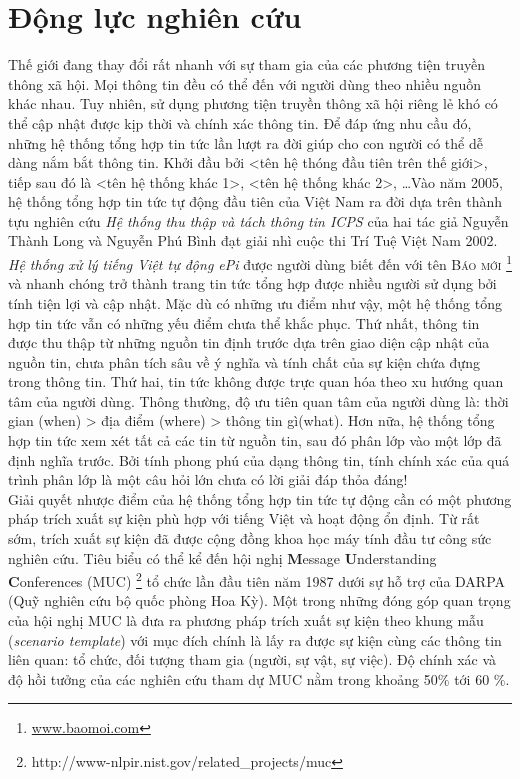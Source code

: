 \section{Động lực nghiên cứu}
\label{motivation}
\noindent \noindent Thế giới đang thay đổi rất nhanh  với sự tham gia của các phương tiện truyền thông xã hội. Mọi thông tin đều có thể đến với người dùng theo nhiều nguồn khác nhau. Tuy nhiên, sử dụng phương tiện truyền thông xã hội riêng lẻ khó có thể cập nhật được kịp thời và chính xác thông tin. Để đáp ứng nhu cầu đó, những hệ thống tổng hợp tin tức lần lượt ra đời giúp cho con người có thể dễ dàng nắm bắt thông tin. Khởi đầu bởi <tên hệ thóng đầu tiên trên thế giới>, tiếp sau đó là  <tên hệ thống khác 1>, <tên hệ thống khác 2>, \ldots Vào năm 2005, hệ thống tổng hợp tin tức tự động đầu tiên của Việt Nam ra đời dựa trên thành tựu nghiên cứu \emph{Hệ thống thu thập và tách thông tin ICPS} của hai tác giả Nguyễn Thành Long và Nguyễn Phú Bình đạt giải nhì cuộc thi Trí Tuệ Việt Nam 2002. \emph{Hệ thống xử lý tiếng Việt tự động ePi}  được người dùng biết đến với tên \textsc{Báo mới} \footnote{\href{www.baomoi.com}{www.baomoi.com}} và nhanh chóng trở thành trang tin tức tổng hợp được nhiều người sử dụng bởi tính tiện lợi và cập nhật. Mặc dù có những ưu điểm như vậy, một hệ thống tổng hợp tin tức vẫn có những yếu điểm chưa thể khắc phục. Thứ nhất, thông tin được thu thập từ những nguồn tin định trước dựa trên giao diện cập nhật của nguồn tin, chưa phân tích sâu về ý nghĩa và tính chất của sự kiện chứa đựng trong thông tin. Thứ hai, tin tức không được trực quan hóa theo xu hướng quan tâm của người dùng. Thông thường, độ ưu tiên quan tâm của người dùng là: thời gian (when) > địa điểm (where) >  thông tin gì(what). Hơn nữa, hệ thống tổng hợp tin tức xem xét tất cả các tin từ nguồn tin, sau đó phân lớp vào một lớp đã định nghĩa trước. Bởi tính phong phú của dạng thông tin, tính chính xác của quá trình phân lớp là một câu hỏi lớn chưa có lời giải đáp thỏa đáng! \\
\noindent Giải quyết nhược điểm của hệ thống tổng hợp tin tức tự động cần có một phương pháp trích xuất sự kiện phù hợp với tiếng Việt và hoạt động ổn định. Từ rất sớm, trích xuất sự kiện đã được cộng đồng khoa học máy tính đầu tư công sức nghiên cứu. Tiêu biểu có thể kể đến hội nghị \textbf{M}essage \textbf{U}nderstanding \textbf{C}onferences (MUC) \footnote{http://www-nlpir.nist.gov/related\_projects/muc}   tổ chức lần đầu tiên  năm 1987 dưới sự hỗ trợ của DARPA (Quỹ nghiên cứu bộ quốc phòng Hoa Kỳ). Một trong những đóng góp quan trọng của hội nghị MUC là đưa ra phương pháp trích xuất sự kiện theo khung  mẫu (\emph{scenario template}) với mục đích chính là lấy ra được sự kiện cùng các thông tin liên quan: tổ chức, đối tượng tham gia (người, sự vật, sự  việc). Độ chính xác và độ hồi tưởng của các nghiên cứu tham dự MUC nằm trong khoảng 50$\%$ tới 60 $\%$.
